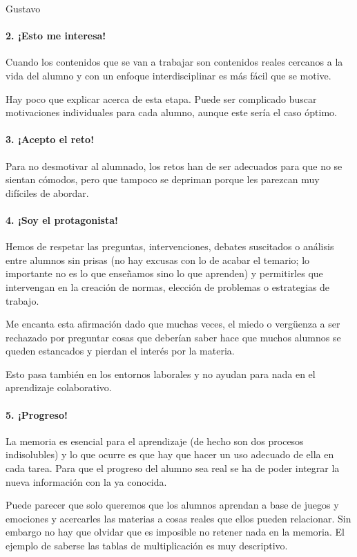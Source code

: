 \begin{opin}{\guscolor}{Gustavo}
\paragraph{2. ¡Esto me interesa!}

Cuando los contenidos que se van a trabajar son contenidos reales cercanos a la vida del alumno y con un enfoque interdisciplinar es más fácil que se motive.

Hay poco que explicar acerca de esta etapa. Puede ser complicado buscar motivaciones individuales para cada alumno, aunque este sería el caso óptimo.

\paragraph{3. ¡Acepto el reto!}

Para no desmotivar al alumnado, los retos han de ser adecuados para que no se sientan cómodos, pero que tampoco se depriman porque les parezcan muy difíciles de abordar.

\paragraph{4. ¡Soy el protagonista!}

Hemos de respetar las preguntas, intervenciones, debates suscitados o análisis entre alumnos sin prisas (no hay excusas con lo de acabar el temario; lo importante no es lo que enseñamos sino lo que aprenden) y permitirles que intervengan en la creación de normas, elección de problemas o estrategias de trabajo.

Me encanta esta afirmación dado que muchas veces, el miedo o vergüenza a ser rechazado por preguntar cosas que deberían saber hace que muchos alumnos se queden estancados y pierdan el interés por la materia.

Esto pasa también en los entornos laborales y no ayudan para nada en el aprendizaje colaborativo.

\paragraph{5. ¡Progreso!}

La memoria es esencial para el aprendizaje (de hecho son dos procesos indisolubles) y lo que ocurre es que hay que hacer un uso adecuado de ella en cada tarea. Para que el progreso del alumno sea real se ha de poder integrar la nueva información con la ya conocida.

Puede parecer que solo queremos que los alumnos aprendan a base de juegos y emociones y acercarles las materias a cosas reales que ellos pueden relacionar. Sin embargo no hay que olvidar que es imposible no retener nada en la memoria. El ejemplo de saberse las tablas de multiplicación es muy descriptivo.


\end{opin}
